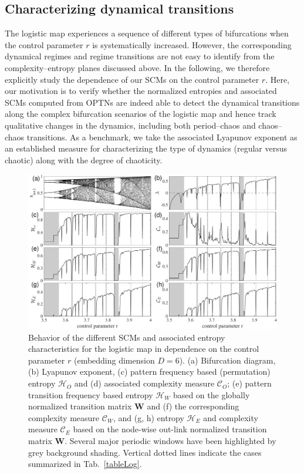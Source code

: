 \documentclass[aip,cha,reprint,nofootinbib]{revtex4-1}
\begin{document}
\subsection{Characterizing dynamical transitions} \label{sec:transi}
The logistic map experiences a sequence of different types of bifurcations when the control parameter $r$ is systematically increased. However, the corresponding dynamical regimes and regime transitions are not easy to identify from the complexity--entropy planes discussed above. In the following, we therefore explicitly study the dependence of our SCMs on the control parameter $r$. Here, our motivation is to verify whether the normalized entropies and associated SCMs computed from OPTNs are indeed able to detect the dynamical transitions along the complex bifurcation scenarios of the logistic map and hence track qualitative changes in the dynamics, including both period--chaos and chaos--chaos transitions. As a benchmark, we take the associated Lyapunov exponent as an established measure for characterizing the type of dynamics (regular versus chaotic) along with the degree of chaoticity.

\begin{figure}
	\centering 
	\includegraphics[width=2\columnwidth]{logisticEntropy.pdf}
\caption{\small{Behavior of the different SCMs and associated entropy characteristics for the logistic map in dependence on the control parameter $r$ {\color{red}(embedding dimension $D = 6$).} (a) Bifurcation diagram, (b) Lyapunov exponent, (c) pattern frequency based (permutation) entropy $\mathcal{H}_O$ and (d) associated complexity measure $\mathcal{C}_O$; (e) pattern transition frequency based entropy $\mathcal{H}_W$ based on the globally normalized transition matrix $\mathbf{W}$ and (f) the corresponding complexity measure $\mathcal{C}_W$, and (g, h) entropy $\mathcal{H}_E$ and complexity measure $\mathcal{C}_E$ based on the node-wise out-link normalized transition matrix $\mathbf{W}$. Several major periodic windows have been highlighted by grey background shading. Vertical dotted lines indicate the cases summarized in Tab.~\ref{tableLog}. } \label{fig:bifurcation}}
\end{figure}
\end{document}
